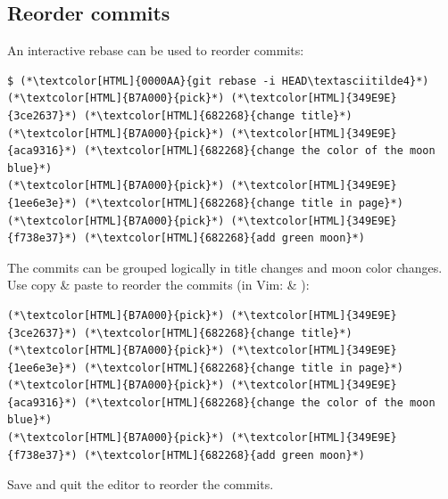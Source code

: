 \subsection{Reorder commits}
\begin{frame}[fragile]
  \subslidetitle
  An interactive rebase can be used to reorder commits:

  \begin{lstlisting}
$ (*\textcolor[HTML]{0000AA}{git rebase -i HEAD\textasciitilde4}*)
(*\textcolor[HTML]{B7A000}{pick}*) (*\textcolor[HTML]{349E9E}{3ce2637}*) (*\textcolor[HTML]{682268}{change title}*)
(*\textcolor[HTML]{B7A000}{pick}*) (*\textcolor[HTML]{349E9E}{aca9316}*) (*\textcolor[HTML]{682268}{change the color of the moon blue}*)
(*\textcolor[HTML]{B7A000}{pick}*) (*\textcolor[HTML]{349E9E}{1ee6e3e}*) (*\textcolor[HTML]{682268}{change title in page}*)
(*\textcolor[HTML]{B7A000}{pick}*) (*\textcolor[HTML]{349E9E}{f738e37}*) (*\textcolor[HTML]{682268}{add green moon}*)
\end{lstlisting}

  The commits can be grouped logically in title changes and moon color changes.\\
  Use copy \& paste to reorder the commits (in Vim:  \& ):

  \begin{lstlisting}
(*\textcolor[HTML]{B7A000}{pick}*) (*\textcolor[HTML]{349E9E}{3ce2637}*) (*\textcolor[HTML]{682268}{change title}*)
(*\textcolor[HTML]{B7A000}{pick}*) (*\textcolor[HTML]{349E9E}{1ee6e3e}*) (*\textcolor[HTML]{682268}{change title in page}*)
(*\textcolor[HTML]{B7A000}{pick}*) (*\textcolor[HTML]{349E9E}{aca9316}*) (*\textcolor[HTML]{682268}{change the color of the moon blue}*)
(*\textcolor[HTML]{B7A000}{pick}*) (*\textcolor[HTML]{349E9E}{f738e37}*) (*\textcolor[HTML]{682268}{add green moon}*)
\end{lstlisting}

  Save and quit the editor to reorder the commits.
\end{frame}


